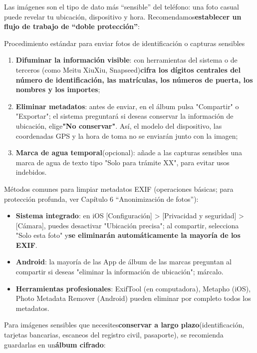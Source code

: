 
Las imágenes son el tipo de dato más “sensible” del teléfono: una foto casual puede revelar tu ubicación, dispositivo y hora. Recomendamos\textbf{establecer un flujo de trabajo de “doble protección”}:

\begin{tcbwarn}{Procedimiento estándar para enviar fotos de identificación o capturas sensibles}
\begin{enumerate}
  \item \textbf{Difuminar la información visible}: con herramientas del sistema o de terceros (como Meitu XiuXiu, Snapseed)\textbf{cifra los dígitos centrales del número de identificación, las matrículas, los números de puerta, los nombres y los importes};
  \item \textbf{Eliminar metadatos}: antes de enviar, en el álbum pulsa "Compartir" o "Exportar"; el sistema preguntará si deseas conservar la información de ubicación, elige\textbf{"No conservar"}. Así, el modelo del dispositivo, las coordenadas GPS y la hora de toma no se enviarán junto con la imagen;
  \item \textbf{Marca de agua temporal}(opcional): añade a las capturas sensibles una marca de agua de texto tipo "Solo para trámite XX", para evitar usos indebidos.
\end{enumerate}

\end{tcbwarn}

Métodos comunes para limpiar metadatos EXIF (operaciones básicas; para protección profunda, ver Capítulo 6 “Anonimización de fotos”):

\begin{itemize}
  \item \textbf{Sistema integrado}: en iOS [Configuración] > [Privacidad y seguridad] > [Cámara], puedes desactivar "Ubicación precisa"; al compartir, selecciona "Solo esta foto" y\textbf{se eliminarán automáticamente la mayoría de los EXIF}.
  \item \textbf{Android}: la mayoría de las App de álbum de las marcas preguntan al compartir si deseas "eliminar la información de ubicación"; márcalo.
  \item \textbf{Herramientas profesionales}: ExifTool (en computadora), Metapho (iOS), Photo Metadata Remover (Android) pueden eliminar por completo todos los metadatos.
\end{itemize}

Para imágenes sensibles que necesites\textbf{conservar a largo plazo}(identificación, tarjetas bancarias, escaneos del registro civil, pasaporte), se recomienda guardarlas en un\textbf{álbum cifrado}:


